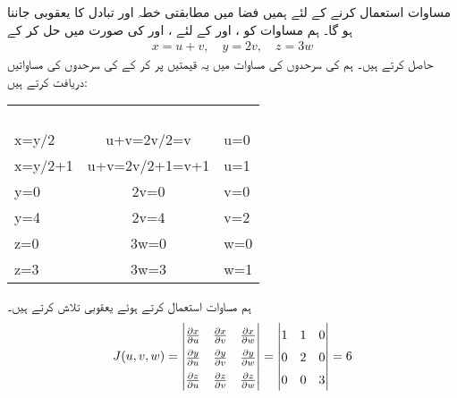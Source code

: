 مساوات   استعمال کرنے کے لئے ہمیں    فضا میں  مطابقتی خطہ  اور تبادل کا یعقوبی جاننا ہو گا۔ ہم مساوات  کو ،  اور  کے لئے ،  اور  کی صورت میں حل کر کے 
\begin{align}\label{مساوات_بالکثرت_نئے_متغیرات}
x=u+v,\quad y=2v,\quad z=3w
\end{align}
حاصل کرتے ہیں۔ ہم  کی سرحدوں کی مساوات میں  یہ قیمتیں پر کر کے   کی سرحدوں کی مساواتیں دریافت کرتے ہیں:
\begin{center}
\begin{tabular}{LCL}
\toprule
\begin{minipage}{2cm}\\   \end{minipage}&
\begin{minipage}{2cm}\\   \end{minipage}&
\begin{minipage}{2cm}\\   \end{minipage}\\
\midrule
x=y/2&u+v=2v/2=v&u=0\\
x=y/2+1&u+v=2v/2+1=v+1&u=1\\
y=0&2v=0&v=0\\
y=4&2v=4&v=2\\
z=0&3w=0&w=0\\
z=3&3w=3&w=1\\
\bottomrule
\end{tabular}
\end{center}
ہم مساوات  استعمال کرتے ہوئے یعقوبی تلاش کرتے ہیں۔
\begin{align*}
\renewcommand{\arraystretch}{1.5}
J(u,v,w)=\begin{vmatrix}
\frac{\partial x}{\partial u} &\frac{\partial x}{\partial v}&\frac{\partial x}{\partial w}\\
\frac{\partial y}{\partial u}&\frac{\partial y}{\partial v}&\frac{\partial y}{\partial w}\\
\frac{\partial z}{\partial u}&\frac{\partial z}{\partial v}&\frac{\partial z}{\partial w}
\end{vmatrix}=\begin{vmatrix}
1&1&0\\
0&2&0\\
0&0&3
\end{vmatrix}=6
\end{align*}
